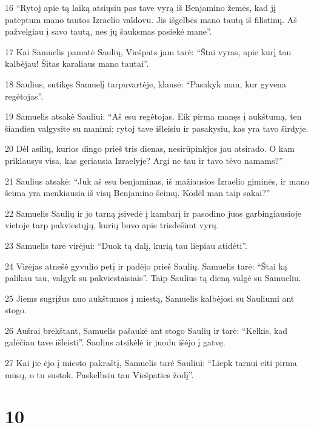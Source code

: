 \par 16 “Rytoj apie tą laiką atsiųsiu pas tave vyrą iš Benjamino žemės, kad jį pateptum mano tautos Izraelio valdovu. Jis išgelbės mano tautą iš filistinų. Aš pažvelgiau į savo tautą, nes jų šauksmas pasiekė mane”. 
\par 17 Kai Samuelis pamatė Saulių, Viešpats jam tarė: “Štai vyras, apie kurį tau kalbėjau! Šitas karaliaus mano tautai”. 
\par 18 Saulius, sutikęs Samuelį tarpuvartėje, klausė: “Pasakyk man, kur gyvena regėtojas”. 
\par 19 Samuelis atsakė Sauliui: “Aš esu regėtojas. Eik pirma manęs į aukštumą, ten šiandien valgysite su manimi; rytoj tave išleisiu ir pasakysiu, kas yra tavo širdyje. 
\par 20 Dėl asilių, kurios dingo prieš tris dienas, nesirūpink­jos jau atsirado. O kam priklausys visa, kas geriausia Izraelyje? Argi ne tau ir tavo tėvo namams?” 
\par 21 Saulius atsakė: “Juk aš esu benjaminas, iš mažiausios Izraelio giminės, ir mano šeima yra menkiausia iš visų Benjamino šeimų. Kodėl man taip sakai?” 
\par 22 Samuelis Saulių ir jo tarną įsivedė į kambarį ir pasodino juos garbingiausioje vietoje tarp pakviestųjų, kurių buvo apie trisdešimt vyrų. 
\par 23 Samuelis tarė virėjui: “Duok tą dalį, kurią tau liepiau atidėti”. 
\par 24 Virėjas atnešė gyvulio petį ir padėjo prieš Saulių. Samuelis tarė: “Štai ką palikau tau, valgyk su pakviestaisiais”. Taip Saulius tą dieną valgė su Samueliu. 
\par 25 Jiems sugrįžus nuo aukštumos į miestą, Samuelis kalbėjosi su Sauliumi ant stogo. 
\par 26 Aušrai brėkštant, Samuelis pašaukė ant stogo Saulių ir tarė: “Kelkis, kad galėčiau tave išleisti”. Saulius atsikėlė ir juodu išėjo į gatvę. 
\par 27 Kai jie ėjo į miesto pakraštį, Samuelis tarė Sauliui: “Liepk tarnui eiti pirma mūsų, o tu sustok. Paskelbsiu tau Viešpaties žodį”.



\chapter{10}

